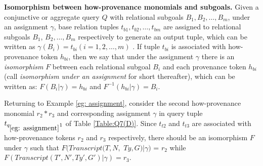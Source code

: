\begin{definition}
{\bf Isomorphism between how-provenance monomials and subgoals.}  Given a conjunctive or aggregate query $Q$ with relational subgoals $B_1, B_2, \dots, B_m$,
\eat{\begin{tabbing}
\noindent
{\tt $Q(X_1, X_2,\dots, X_t) :- B_1, B_2, \dots, B_m, condition(Q)$}
\end{tabbing}}
under an assignment $\gamma$, base relation tuples $t_{b1}, t_{b2}, \dots, t_{bm}$ are assigned to relational subgoals $B_1$, $B_2, \dots, B_m$ respectively to generate an output tuple, which can be written as $\gamma(B_i) = t_{bi} (i=1,2,\dots, m)$ \cite{amsterdamer2011provenance}. If tuple $t_{bi}$ is associated with how-provenance token $h_{bi}$, then we say that under the assignment $\gamma$ there is an {\em isomorphism} $F$ between each relational subgoal $B_i$ and each provenance token $h_{bi}$ (call {\em isomorphism under an assignment} for short thereafter), which can be written as: $F(B_i|\gamma) = h_{bi}$ and $F^{-1}(h_{bi}|\gamma) = B_i$.
\end{definition}

Returning to Example \ref{eg: assignment}, consider the second how-provenance monomial $r_2*r_3$ and corresponding {assignment} $\gamma$ in query tuple $t_{q_{\ref{eg: assignment}}1}$ of Table \ref{Table:Q7(D)}. Since $t_{t2}$ and $t_{t3}$ are associated with how-provenance tokens $r_2$ and $r_3$ respectively, there should be an isomorphism $F$ under $\gamma$ such that $F(Transcript(T, N,$ $Ty, G)|\gamma)$ = $r_2$ while $F(Transcript(T', N', Ty', G')|\gamma) = r_3$.




